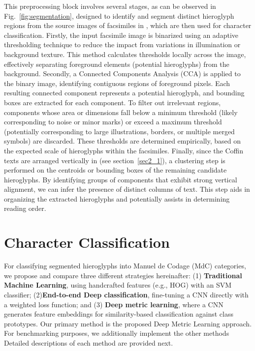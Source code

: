 \documentclass[10pt,onecolumn,letterpaper]{article}
\begin{document}
This preprocessing block involves several stages, as can be observed in Fig.~\ref{fig:segmentation}, designed to identify and segment distinct hieroglyph  regions from the source images of facsimiles in \cite{Buck61}, which are then used for character classification.
Firstly, the input facsimile image is binarized using an adaptive thresholding technique to reduce the impact from variations in illumination or background texture. This method calculates thresholds locally across the image, effectively separating foreground elements (potential hieroglyphs) from the background. Secondly, a Connected Components Analysis (CCA) is applied to the binary image, identifying contiguous regions of foreground pixels. Each resulting connected component represents a potential hieroglyph, and bounding boxes are extracted for each component. To filter out irrelevant regions, components whose area or dimensions fall below a minimum threshold (likely corresponding to noise or minor marks) or exceed a maximum threshold (potentially corresponding to large illustrations, borders, or multiple merged symbols) are discarded. These thresholds are determined empirically, based on the expected scale of hieroglyphs within the facsimiles. Finally, since the Coffin texts are arranged vertically in \cite{Buck61} (see section~\ref{sec2_1}), a clustering step is performed on the centroids or bounding boxes of the remaining candidate hieroglyphs. By identifying groups of components that exhibit strong vertical alignment, we can infer the presence of distinct columns of text. This step aids in organizing the extracted hieroglyphs and potentially assists in determining reading order.


\section{Character Classification}
\label{sec4}

For classifying segmented hieroglyphs into Manuel de Codage (MdC) categories, we propose and compare three different strategies hereinafter: (1) \textbf{Traditional Machine Learning}, using handcrafted features (e.g., HOG) with an SVM classifier; (2)\textbf{End-to-end Deep classification}, fine-tuning a CNN directly with a weighted loss function; and (3) \textbf{Deep metric learning}, where a CNN generates feature embeddings for similarity-based classification against class prototypes.  Our primary method is the proposed Deep Metric Learning approach. For benchmarking purposes, we additionally implement the other methods Detailed descriptions of each method are provided next. 
\end{document}
